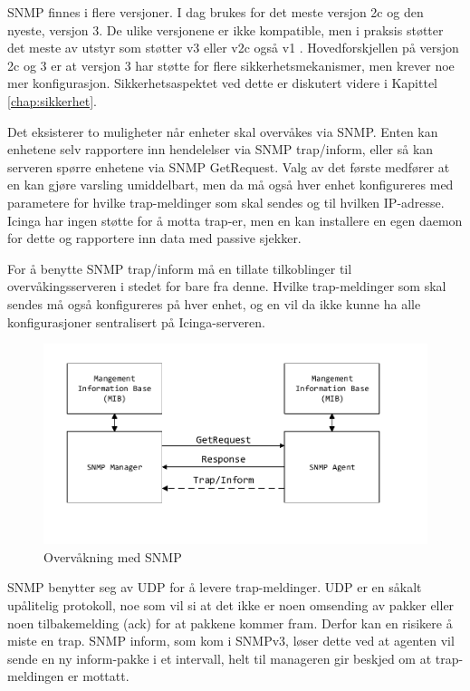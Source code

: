 SNMP finnes i flere versjoner. I dag brukes for det meste versjon 2c og den nyeste, versjon 3. De ulike versjonene er ikke kompatible, men i praksis støtter det meste av utstyr som støtter v3 eller v2c også v1 \cite{rfc3584}. Hovedforskjellen på versjon 2c og 3 er at versjon 3 har støtte for flere sikkerhetsmekanismer, men krever noe mer konfigurasjon. Sikkerhetsaspektet ved dette er diskutert videre i Kapittel \ref{chap:sikkerhet}.

Det eksisterer to muligheter når enheter skal overvåkes via SNMP. Enten kan enhetene selv rapportere inn hendelelser via SNMP trap/inform, eller så kan serveren spørre enhetene via SNMP GetRequest. Valg av det første medfører at en kan gjøre varsling umiddelbart, men da må også hver enhet konfigureres med parametere for hvilke trap-meldinger som skal sendes og til hvilken IP-adresse. Icinga har ingen støtte for å motta trap-er, men en kan installere en egen daemon for dette og rapportere inn data med passive sjekker. 

For å benytte SNMP trap/inform må en tillate tilkoblinger til overvåkingsserveren i stedet for bare fra denne. Hvilke trap-meldinger som skal sendes må også konfigureres på hver enhet, og en vil da ikke kunne ha alle konfigurasjoner sentralisert på Icinga-serveren.

\begin{figure}[H]
    \centering
    \includegraphics{img/SNMP}
    \caption{Overvåkning med SNMP}
    \label{SNMP}
\end{figure}

SNMP benytter seg av UDP for å levere trap-meldinger. UDP er en såkalt upålitelig protokoll, noe som vil si at det ikke er noen omsending av pakker eller noen tilbakemelding (ack) for at pakkene kommer fram. Derfor kan en risikere å miste en trap. SNMP inform, som kom i SNMPv3, løser dette ved at agenten vil sende en ny inform-pakke i et intervall, helt til manageren gir beskjed om at trap-meldingen er mottatt.

